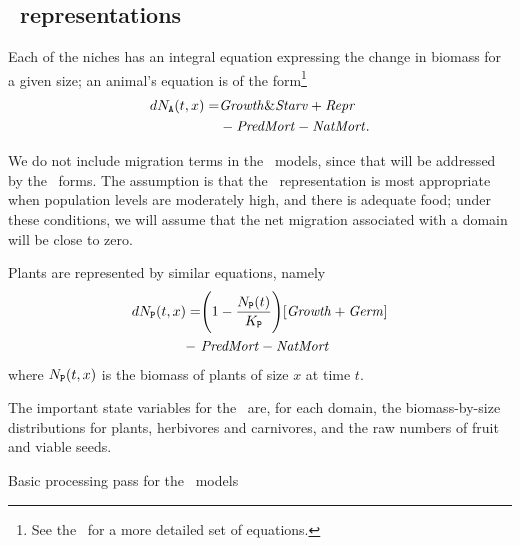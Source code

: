 \subsection*{\SD\ rep\-re\-sen\-ta\-tions}

Each of the niches has an integral equation expressing the change in
biomass for a given size; an animal's equation is of the
form\footnote{See the \SuppMaterial\ for a more detailed set of
  equations.}
\begin{align*}
  dN_{\mathtt{A}}(t,x) = & \mathit{Growth\&Starv} + \mathit{Repr} \\
  & - \mathit{PredMort} -\mathit{NatMort}.
\end{align*}

We do not include migration terms in the \SD\ models, since that will
be addressed by the \IB\ forms. The assumption is that the
\SD\ rep\-re\-sen\-ta\-tion is most appropriate when population levels are
moderately high, and there is adequate food; under these conditions,
we will assume that the net migration associated with a domain will be
close to zero.

Plants are represented by similar equations, namely
\begin{align*}
dN_{\mathtt{P}}(t,x) = &\Biggl(1 - \frac{N_{\mathtt{P}}(t)}{K_{\mathtt{P}}}\Biggr)[\mathit{Growth} + \mathit{Germ}] \\- \
& \mathit{PredMort} - \mathit{NatMort}
\end{align*}
where $N_{\mathtt{P}}(t,x)$ is the biomass of plants of size $x$ at time $t$.


The important state variables for the \SD\ are, for each domain, the
biomass-by-size distributions for plants, herbivores and carnivores, and the
raw numbers of fruit and viable seeds. 

\begin{algorithm}
  \caption{Basic processing pass for the \SD\ models}
  \label{sdalg}
\begin{algorithmic}
  \EndFor
\end{algorithmic}   
\end{algorithm}

